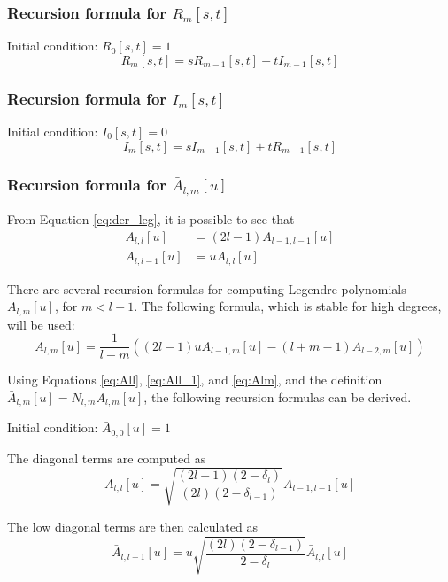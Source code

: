 \documentclass[]{AVSSimReportMemo}
\begin{document}
\subsubsection{Recursion formula for $R_m[s,t]$}

Initial condition: $R_0[s,t] = 1$
\begin{equation}
R_m[s,t] = s R_{m-1}[s,t] - t I_{m-1}[s,t]
\end{equation}

\subsubsection{Recursion formula for $I_m[s,t]$}

Initial condition: $I_0[s,t] = 0$
\begin{equation}
I_m[s,t] = s I_{m-1}[s,t] + t R_{m-1}[s,t]
\end{equation}

\subsubsection{Recursion formula for $\bar A_{l,m}[u]$}

From Equation \eqref{eq:der_leg}, it is possible to see that
\begin{align}
A_{l,l}[u] &= (2 l -1) A_{l-1,l-1}[u]\label{eq:All}\\
A_{l,l-1}[u] &= u A_{l,l}[u]\label{eq:All_1}
\end{align}

There are several recursion formulas for computing Legendre polynomials $A_{l,m}[u]$, for $m < l-1$. The following formula, which is stable for high degrees\cite{lundberg1988}, will be used:
\begin{equation}
A_{l,m}[u] = \frac{1}{l-m} ((2 l -1) u A_{l-1,m}[u] - (l+m-1) A_{l-2,m}[u])\label{eq:Alm}
\end{equation}

Using Equations \eqref{eq:All}, \eqref{eq:All_1}, and \eqref{eq:Alm}, and the definition $\bar A_{l,m}[u] = N_{l,m} A_{l,m}[u]$, the following recursion formulas can be derived.

Initial condition: $\bar A_{0,0}[u] = 1$

The diagonal terms are computed as
\begin{equation}
\bar A_{l,l}[u] = \sqrt{\frac{(2 l - 1) (2 - \delta_l)}{(2 l) (2 - \delta_{l-1})}} \bar A_{l-1,l-1}[u]
\end{equation}

The low diagonal terms are then calculated as
\begin{equation}
\bar A_{l,l-1}[u] = u \sqrt{\frac{(2 l) (2 - \delta_{l-1})}{2 - \delta_l}} \bar A_{l,l}[u]
\end{equation}
\end{document}
